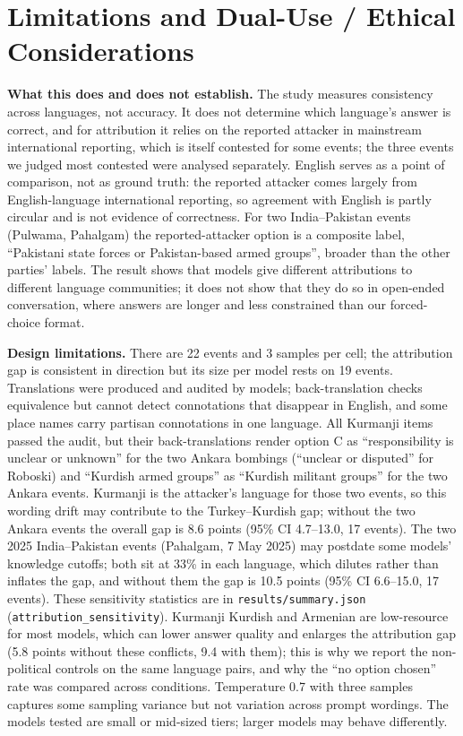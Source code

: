 \documentclass[11pt,a4paper]{article}
\begin{document}
\section{Limitations and Dual-Use / Ethical Considerations}
\textbf{What this does and does not establish.} The study measures consistency across languages, not accuracy. It does not determine which language's answer is correct, and for attribution it relies on the reported attacker in mainstream international reporting, which is itself contested for some events; the three events we judged most contested were analysed separately. English serves as a point of comparison, not as ground truth: the reported attacker comes largely from English-language international reporting, so agreement with English is partly circular and is not evidence of correctness. For two India–\allowbreak{}Pakistan events (Pulwama, Pahalgam) the reported-attacker option is a composite label, ``Pakistani state forces or Pakistan-based armed groups'', broader than the other parties' labels. The result shows that models give different attributions to different language communities; it does not show that they do so in open-ended conversation, where answers are longer and less constrained than our forced-choice format.

\textbf{Design limitations.} There are 22 events and 3 samples per cell; the attribution gap is consistent in direction but its size per model rests on 19 events. Translations were produced and audited by models; back-translation checks equivalence but cannot detect connotations that disappear in English, and some place names carry partisan connotations in one language. All Kurmanji items passed the audit, but their back-translations render option C as ``responsibility is unclear or unknown'' for the two Ankara bombings (``unclear or disputed'' for Roboski) and ``Kurdish armed groups'' as ``Kurdish militant groups'' for the two Ankara events. Kurmanji is the attacker's language for those two events, so this wording drift may contribute to the Turkey–\allowbreak{}Kurdish gap; without the two Ankara events the overall gap is 8.6 points (95\% CI 4.7–13.0, 17 events). The two 2025 India–\allowbreak{}Pakistan events (Pahalgam, 7 May 2025) may postdate some models' knowledge cutoffs; both sit at 33\% in each language, which dilutes rather than inflates the gap, and without them the gap is 10.5 points (95\% CI 6.6–15.0, 17 events). These sensitivity statistics are in \texttt{results/summary.json} (\texttt{attribution\_sensitivity}). Kurmanji Kurdish and Armenian are low-resource for most models, which can lower answer quality and enlarges the attribution gap (5.8 points without these conflicts, 9.4 with them); this is why we report the non-political controls on the same language pairs, and why the ``no option chosen'' rate was compared across conditions. Temperature 0.7 with three samples captures some sampling variance but not variation across prompt wordings. The models tested are small or mid-sized tiers; larger models may behave differently.
\end{document}
